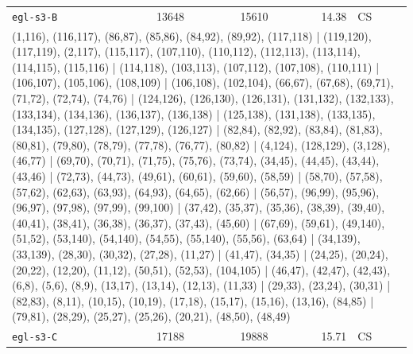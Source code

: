 \begin{longtable}{lrrrl}
\texttt{egl-s3-B} & 13648 & 15610 & 14.38 & CS \\
\multicolumn{5}{p{0.96\linewidth}}{\tiny\raggedright\arraybackslash (1,116), (116,117), (86,87), (85,86), (84,92), (89,92), (117,118) | (119,120), (117,119), (2,117), (115,117), (107,110), (110,112), (112,113), (113,114), (114,115), (115,116) | (114,118), (103,113), (107,112), (107,108), (110,111) | (106,107), (105,106), (108,109) | (106,108), (102,104), (66,67), (67,68), (69,71), (71,72), (72,74), (74,76) | (124,126), (126,130), (126,131), (131,132), (132,133), (133,134), (134,136), (136,137), (136,138) | (125,138), (131,138), (133,135), (134,135), (127,128), (127,129), (126,127) | (82,84), (82,92), (83,84), (81,83), (80,81), (79,80), (78,79), (77,78), (76,77), (80,82) | (4,124), (128,129), (3,128), (46,77) | (69,70), (70,71), (71,75), (75,76), (73,74), (34,45), (44,45), (43,44), (43,46) | (72,73), (44,73), (49,61), (60,61), (59,60), (58,59) | (58,70), (57,58), (57,62), (62,63), (63,93), (64,93), (64,65), (62,66) | (56,57), (96,99), (95,96), (96,97), (97,98), (97,99), (99,100) | (37,42), (35,37), (35,36), (38,39), (39,40), (40,41), (38,41), (36,38), (36,37), (37,43), (45,60) | (67,69), (59,61), (49,140), (51,52), (53,140), (54,140), (54,55), (55,140), (55,56), (63,64) | (34,139), (33,139), (28,30), (30,32), (27,28), (11,27) | (41,47), (34,35) | (24,25), (20,24), (20,22), (12,20), (11,12), (50,51), (52,53), (104,105) | (46,47), (42,47), (42,43), (6,8), (5,6), (8,9), (13,17), (13,14), (12,13), (11,33) | (29,33), (23,24), (30,31) | (82,83), (8,11), (10,15), (10,19), (17,18), (15,17), (15,16), (13,16), (84,85) | (79,81), (28,29), (25,27), (25,26), (20,21), (48,50), (48,49)} \\[2pt]
\texttt{egl-s3-C} & 17188 & 19888 & 15.71 & CS \\

\end{longtable}

